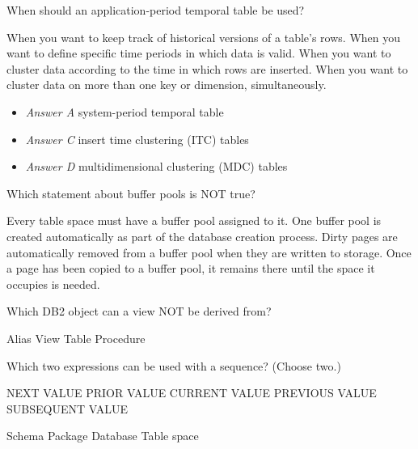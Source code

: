 \documentclass[answers, 11pt]{exam}
\begin{document}
\begin{questions}
\newpage
\question[1]
When should an application-period temporal table be used?
\begin{choices}
	\choice When you want to keep track of historical versions of a table's rows.
	\CorrectChoice When you want to define specific time periods in which data is valid.
	\choice When you want to cluster data according to the time in which rows are inserted.
	\choice When you want to cluster data on more than one key or dimension, simultaneously.
\end{choices}

\begin{solution}
	\begin{itemize}
		\item \textit{Answer A} system-period temporal table
		\item \textit{Answer C} insert time clustering (ITC) tables
		\item \textit{Answer D} multidimensional clustering (MDC) tables 
	\end{itemize}
\end{solution}

\question[1]
Which statement about buffer pools is NOT true?
\begin{choices}
	\choice Every table space must have a buffer pool assigned to it.
	\choice One buffer pool is created automatically as part of the database creation process.
	\CorrectChoice Dirty pages are automatically removed from a buffer pool when they are written to storage.
	\choice Once a page has been copied to a buffer pool, it remains there until the space it occupies is 
	needed.
\end{choices}

\question[1]
Which DB2 object can a view NOT be derived from?
\begin{choices}
	\choice Alias
	\choice View
	\choice Table
	\CorrectChoice Procedure
\end{choices}

\question[1]
Which two expressions can be used with a sequence? (Choose two.)
\begin{choices}
	\CorrectChoice NEXT VALUE
	\choice PRIOR VALUE
	\choice CURRENT VALUE
	\CorrectChoice PREVIOUS VALUE
	\choice SUBSEQUENT VALUE
\end{choices}

\newpage
{}
\begin{choices}
	\CorrectChoice Schema
	\choice Package
	\choice Database
	\choice Table space
\end{choices}


\end{questions}
\end{document}
